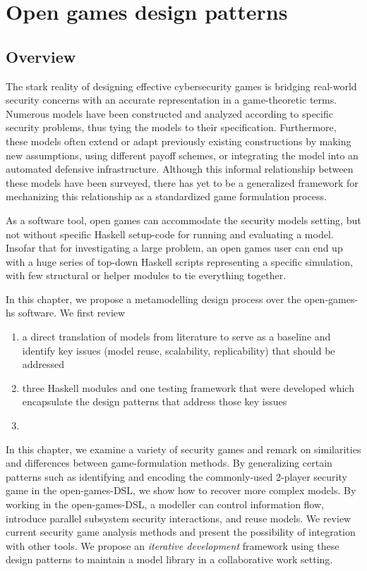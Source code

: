 \section{Open games design patterns}
\label{sec:design}
\subsection{Overview}

The stark reality of designing effective cybersecurity games is bridging real-world security concerns with an accurate representation in a game-theoretic terms. Numerous models have been constructed and analyzed according to specific security problems, thus tying the models to their specification. Furthermore, these models often extend or adapt previously existing constructions by making new assumptions, using different payoff schemes, or integrating the model into an automated defensive infrastructure. Although this informal relationship between these models have been surveyed, there has yet to be a generalized framework for mechanizing this relationship as a standardized game formulation process. 

As a software tool, open games can accommodate the security models setting, but not without specific Haskell setup-code for running and evaluating a model. Insofar that for investigating a large problem, an open games user can end up with a huge series of top-down Haskell scripts representing a specific simulation, with few structural or helper modules to tie everything together. 

In this chapter, we propose a metamodelling design process over the open-games-hs software. We first review 
\begin{enumerate}
	\item a direct translation of models from literature to serve as a baseline and identify key issues (model reuse, scalability, replicability) that should be addressed 
	\item three Haskell modules and one testing framework that were developed which encapsulate the design patterns that address those key issues 
	\item 
\end{enumerate}

In this chapter, we examine a variety of security games and remark on similarities and differences between game-formulation methods. By generalizing certain patterns such as identifying and encoding the commonly-used 2-player security game in the open-games-DSL, we show how to recover more complex models. By working in the open-games-DSL, a modeller can control information flow, introduce parallel subsystem security interactions, and reuse models. We review current security game analysis methods and present the possibility of integration with other tools. We propose an \textit{iterative development} framework using these design patterns to maintain a model library in a collaborative work setting.





